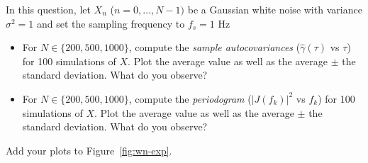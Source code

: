 \documentclass[11pt]{article}
\begin{document}
\begin{exercise}\label{ex:wn-exp}
    In this question, let $X_n$ ($n=0,\dots,N-1)$ be a Gaussian white noise with variance $\sigma^2=1$ and set the sampling frequency to $f_s=1$ Hz
    \begin{itemize}
        \item For $N \in \{200, 500, 1000\}$, compute the \textit{sample autocovariances} ($\hat{\gamma}(\tau)$ vs $\tau$) for 100 simulations of $X$.
        Plot the average value as well as the average $\pm$ the standard deviation.
        What do you observe?
        \item For $N \in \{200, 500, 1000\}$, compute the \textit{periodogram} ($|J(f_k)|^2$ vs $f_k$) for 100 simulations of $X$.
        Plot the average value as well as the average $\pm$ the standard deviation.
        What do you observe?
    \end{itemize}
    Add your plots to Figure~\ref{fig:wn-exp}.
    

\end{exercise}
\end{document}
